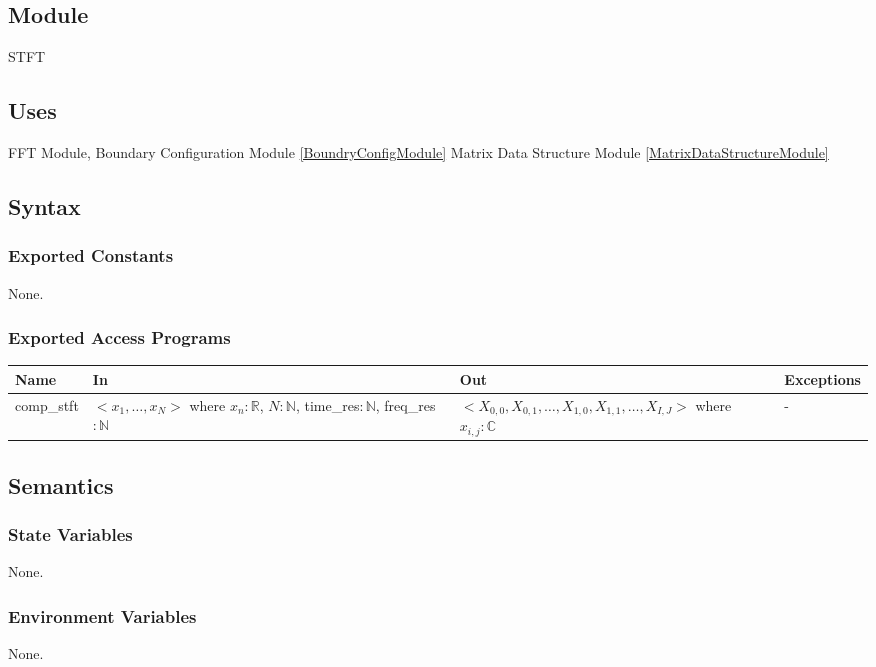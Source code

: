 \documentclass[12pt, titlepage]{article}
\begin{document}

\subsection{Module}
STFT

\subsection{Uses}
FFT Module, Boundary Configuration Module \ref{BoundryConfigModule}  Matrix Data Structure Module \ref{MatrixDataStructureModule}
\subsection{Syntax}

\subsubsection{Exported Constants}
None.
\subsubsection{Exported Access Programs}

\begin{center}
\begin{tabular}{p{2cm} p{4cm} p{4cm} p{2cm}}
\hline
\textbf{Name} & \textbf{In} & \textbf{Out} & \textbf{Exceptions} \\
\hline
comp\_stft & $< x_1, \dots, x_N>$ where $x_n:\mathbb{R}$, $N:\mathbb{N} $, time\_res$:\mathbb{N}$, freq\_res$:\mathbb{N}$ & $< X_{0,0},X_{0,1},\dots,X_{1,0}, X_{1,1},\dots,X_{I,J}>$ where $ x_{i,j}:\mathbb{C}$ & - \\
\hline
\end{tabular}
\end{center}

\subsection{Semantics}

\subsubsection{State Variables}
None.

\subsubsection{Environment Variables}
None.
\end{document}
